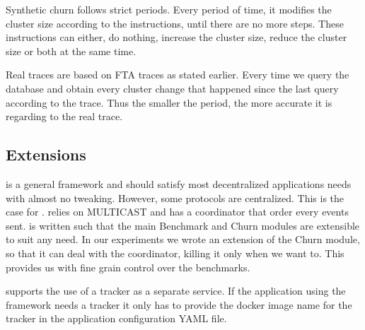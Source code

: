 Synthetic churn follows strict periods. Every period of time, it modifies the cluster size according to the instructions, until there are no more steps. These instructions can either, do nothing, increase the cluster size, reduce the cluster size or both at the same time.

Real traces are based on FTA traces as stated earlier. Every time we query the database and obtain every cluster change that happened since the last query according to the trace. Thus the smaller the period, the more accurate it is regarding to the real trace.
\subsection{Extensions}
\eptotester is a general framework and should satisfy most decentralized applications needs with almost no tweaking. However, some protocols are centralized. This is the case for \jgroups. \jgroups relies on MULTICAST and has a coordinator that order every events sent. \eptotester is written such that the main Benchmark and Churn modules are extensible to suit any need. In our experiments we wrote an extension of the Churn module, so that it can deal with the coordinator, killing it only when we want to. This provides us with fine grain control over the benchmarks. 

\eptotester supports the use of a tracker as a separate service. If the application using the framework needs a tracker it only has to provide the docker image name for the tracker in the application configuration YAML file.